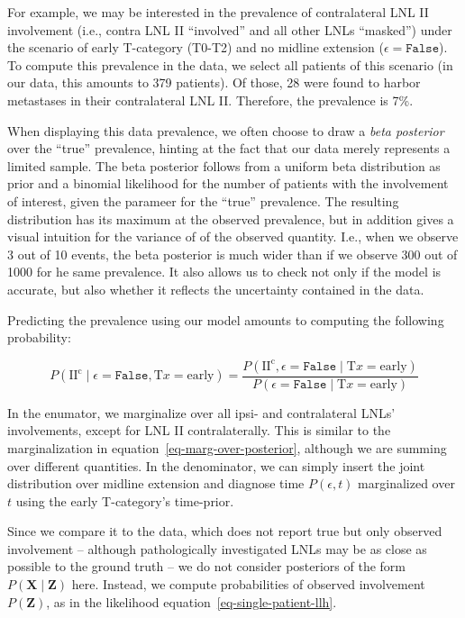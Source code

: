 \documentclass[
  sn-mathphys-num,
]{sn-jnl}
\begin{document}
For example, we may be interested in the prevalence of contralateral LNL
II involvement (i.e., contra LNL II ``involved'' and all other LNLs
``masked'') under the scenario of early T-category (T0-T2) and no
midline extension (\(\epsilon=\texttt{False}\)). To compute this
prevalence in the data, we select all patients of this scenario (in our
data, this amounts to 379 patients). Of those, 28 were found to harbor
metastases in their contralateral LNL II. Therefore, the prevalence is
7\%.

When displaying this data prevalence, we often choose to draw a
\emph{beta posterior} over the ``true'' prevalence, hinting at the fact
that our data merely represents a limited sample. The beta posterior
follows from a uniform beta distribution as prior and a binomial
likelihood for the number of patients with the involvement of interest,
given the parameer for the ``true'' prevalence. The resulting
distribution has its maximum at the observed prevalence, but in addition
gives a visual intuition for the variance of of the observed quantity.
I.e., when we observe 3 out of 10 events, the beta posterior is much
wider than if we observe 300 out of 1000 for he same prevalence. It also
allows us to check not only if the model is accurate, but also whether
it reflects the uncertainty contained in the data.

Predicting the prevalence using our model amounts to computing the
following probability:

\[
P \left( \text{II}^\text{c} \mid \epsilon=\texttt{False}, \text{T}x=\text{early} \right) = \frac{P \left( \text{II}^\text{c}, \epsilon=\texttt{False} \mid \text{T}x=\text{early} \right)}{P \left( \epsilon=\texttt{False} \mid \text{T}x=\text{early} \right)}
\]

In the enumator, we marginalize over all ipsi- and contralateral LNLs'
involvements, except for LNL II contralaterally. This is similar to the
marginalization in equation~\ref{eq-marg-over-posterior}, although we
are summing over different quantities. In the denominator, we can simply
insert the joint distribution over midline extension and diagnose time
\(P \left( \epsilon, t \right)\) marginalized over \(t\) using the early
T-category's time-prior.

Since we compare it to the data, which does not report true but only
observed involvement -- although pathologically investigated LNLs may be
as close as possible to the ground truth -- we do not consider
posteriors of the form \(P \left( \mathbf{X} \mid \mathbf{Z} \right)\)
here. Instead, we compute probabilities of observed involvement
\(P \left( \mathbf{Z} \right)\), as in the likelihood
equation~\ref{eq-single-patient-llh}.
\end{document}
